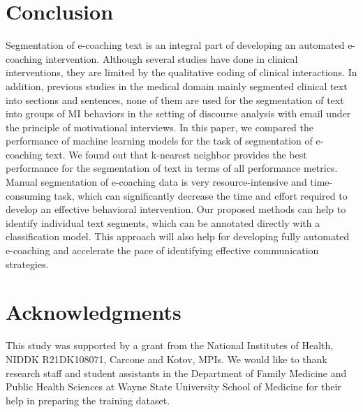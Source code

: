 \documentclass{amia}
\begin{document}
\section*{Conclusion}
Segmentation of e-coaching text is an integral part of developing an automated e-coaching intervention. Although several studies have done in clinical interventions, they are limited by the qualitative coding of clinical interactions. In addition, previous studies in the medical domain mainly segmented clinical text into sections and sentences, none of them are used for the segmentation of text into groups of MI behaviors in the setting of discourse analysis with email under the principle of motivational interviews. In this paper, we compared the performance of machine learning models for the task of segmentation of e-coaching text. We found out that k-nearest neighbor provides the best performance for the segmentation of text in terms of all performance metrics. Manual segmentation of e-coaching data is very resource-intensive and time-consuming task, which can significantly decrease the time and effort required to develop an effective behavioral intervention. Our proposed methods can help to identify individual text segments, which can be annotated directly with a classification model. This approach will also help for developing fully automated e-coaching and accelerate the pace of identifying effective communication strategies.

\section*{Acknowledgments}
This study was supported by a grant from the National Institutes of Health, NIDDK R21DK108071, Carcone and Kotov, MPIs. We would like to thank research staff and student assistants in the Department of Family Medicine and Public Health Sciences at Wayne State University School of Medicine for their help in preparing the training dataset. 



\end{document}
